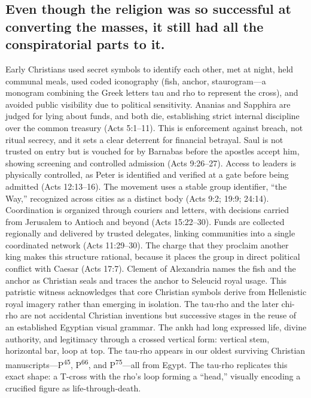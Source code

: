 \subsection{Even though the religion was so successful at converting the masses, it still had all the conspiratorial parts to it.}\label{subsec:even-though-the-religion-was-so-successful-at-converting-the-masses-it-still-had-all-the-conspiratorial-parts-to-it.}

Early Christians used secret symbols to identify each other, met at night, held communal meals, used coded iconography (fish, anchor, staurogram---a monogram combining the Greek letters tau and rho to represent the cross), and avoided public visibility due to political sensitivity.
Ananias and Sapphira are judged for lying about funds, and both die, establishing strict internal discipline over the common treasury (Acts 5:1--11).
This is enforcement against breach, not ritual secrecy, and it sets a clear deterrent for financial betrayal.
Saul is not trusted on entry but is vouched for by Barnabas before the apostles accept him, showing screening and controlled admission (Acts 9:26--27).
Access to leaders is physically controlled, as Peter is identified and verified at a gate before being admitted (Acts 12:13--16).
The movement uses a stable group identifier, ``the Way,'' recognized across cities as a distinct body (Acts 9:2; 19:9; 24:14).
Coordination is organized through couriers and letters, with decisions carried from Jerusalem to Antioch and beyond (Acts 15:22--30).
Funds are collected regionally and delivered by trusted delegates, linking communities into a single coordinated network (Acts 11:29--30).
The charge that they proclaim another king makes this structure rational, because it places the group in direct political conflict with Caesar (Acts 17:7).
Clement of Alexandria names the fish and the anchor as Christian seals and traces the anchor to Seleucid royal usage.
This patristic witness acknowledges that core Christian symbols derive from Hellenistic royal imagery rather than emerging in isolation.
The tau-rho and the later chi-rho are not accidental Christian inventions but successive stages in the reuse of an established Egyptian visual grammar.
The ankh had long expressed life, divine authority, and legitimacy through a crossed vertical form: vertical stem, horizontal bar, loop at top.
The tau-rho appears in our oldest surviving Christian manuscripts---P\textsuperscript{45}, P\textsuperscript{66}, and P\textsuperscript{75}---all from Egypt.
The tau-rho replicates this exact shape: a T-cross with the rho's loop forming a ``head,'' visually encoding a crucified figure as life-through-death.
